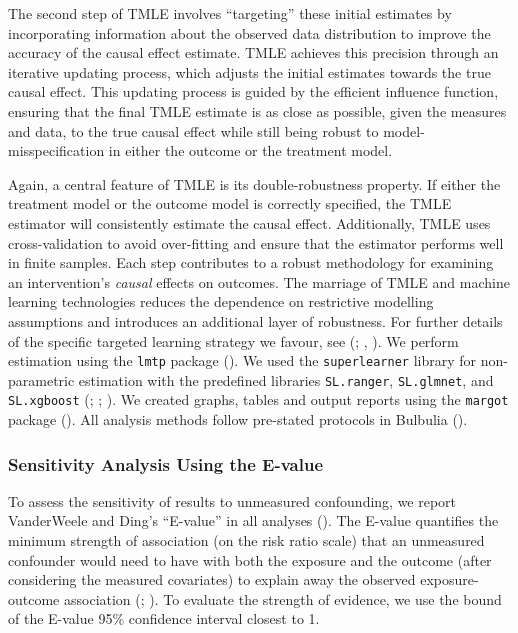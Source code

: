 \documentclass[
  single column]{article}
\begin{document}
The second step of TMLE involves ``targeting'' these initial estimates
by incorporating information about the observed data distribution to
improve the accuracy of the causal effect estimate. TMLE achieves this
precision through an iterative updating process, which adjusts the
initial estimates towards the true causal effect. This updating process
is guided by the efficient influence function, ensuring that the final
TMLE estimate is as close as possible, given the measures and data, to
the true causal effect while still being robust to
model-misspecification in either the outcome or the treatment model.

Again, a central feature of TMLE is its double-robustness property. If
either the treatment model or the outcome model is correctly specified,
the TMLE estimator will consistently estimate the causal effect.
Additionally, TMLE uses cross-validation to avoid over-fitting and
ensure that the estimator performs well in finite samples. Each step
contributes to a robust methodology for examining an intervention's
\emph{causal} effects on outcomes. The marriage of TMLE and machine
learning technologies reduces the dependence on restrictive modelling
assumptions and introduces an additional layer of robustness. For
further details of the specific targeted learning strategy we favour,
see (;
,
). We perform estimation using the
\texttt{lmtp} package (). We used the \texttt{superlearner} library for non-parametric
estimation with the predefined libraries \texttt{SL.ranger},
\texttt{SL.glmnet}, and \texttt{SL.xgboost}
(;
;
). We created graphs,
tables and output reports using the \texttt{margot} package
(). All analysis methods follow
pre-stated protocols in Bulbulia
().

\subsubsection{Sensitivity Analysis Using the
E-value}\label{sensitivity-analysis-using-the-e-value}

To assess the sensitivity of results to unmeasured confounding, we
report VanderWeele and Ding's ``E-value'' in all analyses
(). The E-value
quantifies the minimum strength of association (on the risk ratio scale)
that an unmeasured confounder would need to have with both the exposure
and the outcome (after considering the measured covariates) to explain
away the observed exposure-outcome association
(;
). To
evaluate the strength of evidence, we use the bound of the E-value 95\%
confidence interval closest to 1.
\end{document}
